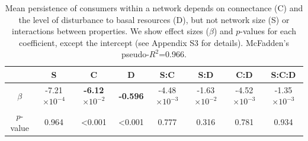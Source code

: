 \documentclass[12pt]{article}
\begin{document}
\begin{spacing}{2.0}
    
    \begin{table}[hb!]
        \caption{Mean persistence of consumers within a network depends on connectance (C) and the level of disturbance to basal resources (D), but not network size (S) or interactions between properties. We show effect sizes ($\beta$) and $p$-values for each coefficient, except the intercept (see Appendix S3 for details). McFadden's pseudo-$R^2$=0.966. }
        \label{tab:per_vs_SC}
        \centering
        \footnotesize
        \begin{tabular}{c| c c c c c c c}
              & S & C & D & S:C & S:D & C:D & S:C:D \\
            \hline
             $\beta$ &	 -7.21$\times10^{-4}$  	& \textbf{-6.12$\times10^{-2}$}	& \textbf{-0.596} &	 -4.48$\times10^{-3}$ &	 -1.63$\times10^{-2}$ 	& -4.52$\times10^{-3}$ &	 -1.35$\times10^{-3}$ \\
             $p$-value &		 0.964 &	 \textless0.001 &	 \textless0.001 &	 0.777 &	 0.316 &	 0.781 &	 0.934 \\
                    \end{tabular}
                \end{table}







\end{spacing}
\end{document}
